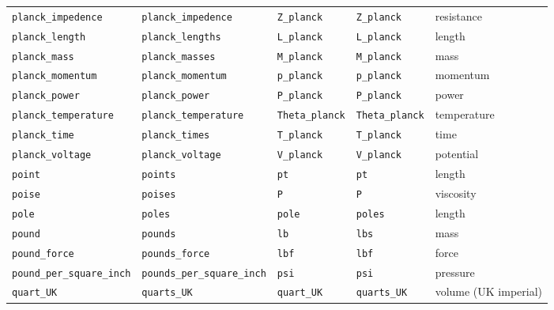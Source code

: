 \begin{landscape}
\begin{center}
\begin{longtable}{|lllll|}
{\tt\footnotesize planck\_impedence} & {\tt\footnotesize planck\_impedence} & {\tt\footnotesize Z\_planck} & {\tt\footnotesize Z\_planck} & resistance \\
{\tt\footnotesize planck\_length} & {\tt\footnotesize planck\_lengths} & {\tt\footnotesize L\_planck} & {\tt\footnotesize L\_planck} & length \\
{\tt\footnotesize planck\_mass} & {\tt\footnotesize planck\_masses} & {\tt\footnotesize M\_planck} & {\tt\footnotesize M\_planck} & mass \\
{\tt\footnotesize planck\_momentum} & {\tt\footnotesize planck\_momentum} & {\tt\footnotesize p\_planck} & {\tt\footnotesize p\_planck} & momentum \\
{\tt\footnotesize planck\_power} & {\tt\footnotesize planck\_power} & {\tt\footnotesize P\_planck} & {\tt\footnotesize P\_planck} & power \\
{\tt\footnotesize planck\_temperature} & {\tt\footnotesize planck\_temperature} & {\tt\footnotesize Theta\_planck} & {\tt\footnotesize Theta\_planck} & temperature \\
{\tt\footnotesize planck\_time} & {\tt\footnotesize planck\_times} & {\tt\footnotesize T\_planck} & {\tt\footnotesize T\_planck} & time \\
{\tt\footnotesize planck\_voltage} & {\tt\footnotesize planck\_voltage} & {\tt\footnotesize V\_planck} & {\tt\footnotesize V\_planck} & potential \\
{\tt\footnotesize point} & {\tt\footnotesize points} & {\tt\footnotesize pt} & {\tt\footnotesize pt} & length \\
{\tt\footnotesize poise} & {\tt\footnotesize poises} & {\tt\footnotesize P} & {\tt\footnotesize P} & viscosity \\
{\tt\footnotesize pole} & {\tt\footnotesize poles} & {\tt\footnotesize pole} & {\tt\footnotesize poles} & length \\
{\tt\footnotesize pound} & {\tt\footnotesize pounds} & {\tt\footnotesize lb} & {\tt\footnotesize lbs} & mass \\
{\tt\footnotesize pound\_force} & {\tt\footnotesize pounds\_force} & {\tt\footnotesize lbf} & {\tt\footnotesize lbf} & force \\
{\tt\footnotesize pound\_per\_square\_inch} & {\tt\footnotesize pounds\_per\_square\_inch} & {\tt\footnotesize psi} & {\tt\footnotesize psi} & pressure \\
{\tt\footnotesize quart\_UK} & {\tt\footnotesize quarts\_UK} & {\tt\footnotesize quart\_UK} & {\tt\footnotesize quarts\_UK} & volume (UK imperial) \\

\end{longtable}
\end{center}
\end{landscape}
